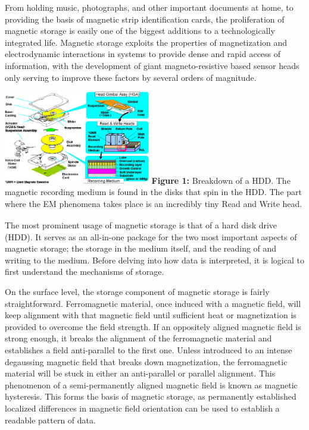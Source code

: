 \documentclass[11pt]{article}
\begin{document}
\begin{multicols}{2} %
From holding music, photographs, and other important documents at home, to providing the basis of magnetic strip identification cards, the proliferation of magnetic storage is easily one of the biggest additions to a technologically integrated life. Magnetic storage exploits the properties of magnetization and electrodynamic interactions in systems to provide dense and rapid access of information, with the development of giant magneto-resistive based sensor heads only serving to improve these factors by several orders of magnitude.
\begin{center}
	\centering
	\includegraphics[width=0.48\textwidth]{HDD_makeup.png}
	{\footnotesize\textbf{Figure 1:} Breakdown of a HDD. The magnetic recording medium is found in the disks that spin in the HDD. The part where the EM phenomena takes place is an incredibly tiny Read and Write head\textsubscript{\cite{label6}}.}
\end{center} 
The most prominent usage of magnetic storage is that of a hard disk drive (HDD). It serves as an all-in-one package for the two most important aspects of magnetic storage; the storage in the medium itself, and the reading of and writing to the medium. Before delving into how data is interpreted, it is logical to first understand the mechanisms of storage.

On the surface level, the storage component of magnetic storage is fairly straightforward. Ferromagnetic material, once induced with a magnetic field, will keep alignment with that magnetic field until sufficient heat or magnetization is provided to overcome the field strength. If an oppositely aligned magnetic field is strong enough, it breaks the alignment of the ferromagnetic material and establishes a field anti-parallel to the first one. Unless introduced to an intense degaussing magnetic field that breaks down magnetization, the ferromagnetic material will be stuck in either an anti-parallel or parallel alignment. This phenomenon of a semi-permanently aligned magnetic field is known as magnetic hysteresis. This forms the basis of magnetic storage, as permanently established localized differences in magnetic field orientation can be used to establish a readable pattern of data\textsubscript{\cite{label1}}.


\end{multicols}
\end{document}
